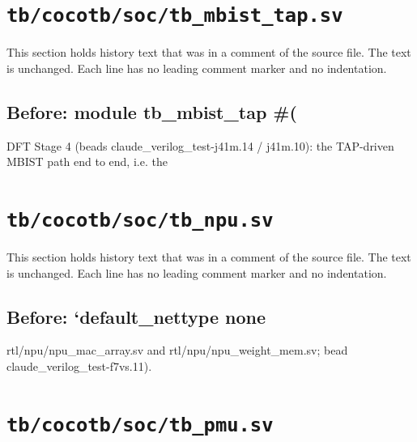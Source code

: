 \section{\texttt{tb/cocotb/soc/tb\_mbist\_tap.sv}}\label{cr:suite:soc-tb-mbist-tap-sv}

This section holds history text that was in a comment of the source file. The text is unchanged. Each line has no leading comment marker and no indentation.

\begin{record}

\subsection*{Before: module tb\_mbist\_tap \#(}

\begin{textblock}
DFT Stage 4 (beads claude_verilog_test-j41m.14 / j41m.10): the TAP-driven MBIST path end to end, i.e. the
\end{textblock}

\end{record}

\section{\texttt{tb/cocotb/soc/tb\_npu.sv}}\label{cr:suite:soc-tb-npu-sv}

This section holds history text that was in a comment of the source file. The text is unchanged. Each line has no leading comment marker and no indentation.

\begin{record}

\subsection*{Before: `default\_nettype none}

\begin{textblock}
rtl/npu/npu_mac_array.sv and rtl/npu/npu_weight_mem.sv; bead claude_verilog_test-f7vs.11).
\end{textblock}

\end{record}

\section{\texttt{tb/cocotb/soc/tb\_pmu.sv}}\label{cr:suite:soc-tb-pmu-sv}

